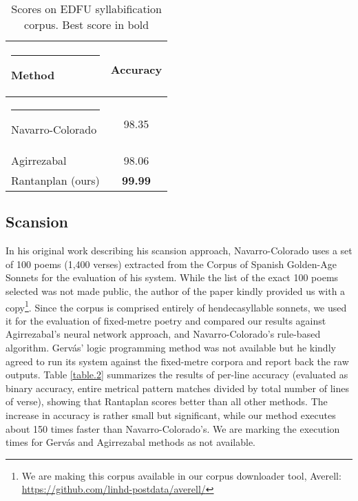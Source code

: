 \documentclass[a4paper,11pt,twocolumn,twoside]{article}
\begin{document}
\begin{table} [htbp]
\begin{center}
\begin{tabular} {lc}
  \hline\rule{-2pt}{15pt}
  {\bf Method} & {\bf Accuracy}\\
  \hline\rule{-4pt}{10pt}
  Navarro-Colorado & 98.35 \\
  Agirrezabal & 98.06 \\
  Rantanplan (ours) & \textbf{99.99} \\
\hline
\end{tabular}
\end{center}
\caption{\label{table.1}Scores on EDFU syllabification corpus. Best score in bold}
\end{table}

\subsection{Scansion}
In his original work describing his scansion approach, Navarro-Colorado uses a set of 100 poems (1,400 verses) extracted from the Corpus of Spanish Golden-Age Sonnets  for the evaluation of his system. While the list of the exact 100 poems selected was not made public, the author of the paper kindly provided us with a copy\footnote{We are making this corpus available in our corpus downloader tool, Averell: \url{https://github.com/linhd-postdata/averell/}}. Since the corpus is comprised entirely of hendecasyllable sonnets, we used it for the evaluation of fixed-metre poetry and compared our results against Agirrezabal's neural network approach, and Navarro-Colorado's rule-based algorithm. Gervás' logic programming method was not available but he kindly agreed to run its system against the fixed-metre corpora and report back the raw outputs. Table \ref{table.2} summarizes the results of per-line accuracy (evaluated as binary accuracy, entire metrical pattern matches divided by total number of lines of verse), showing that Rantaplan scores better than all other methods. The increase in accuracy is rather small but significant, while our method executes about 150 times faster than Navarro-Colorado's. We are marking the execution times for Gervás and Agirrezabal methods as not available.
\end{document}
